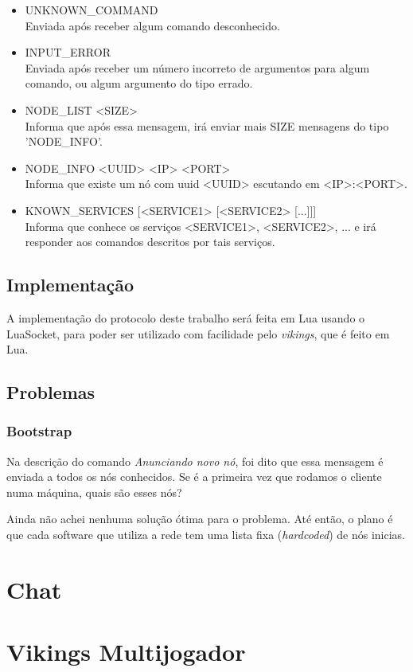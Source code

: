       \begin{itemize}
        \item UNKNOWN\_COMMAND \\
          Enviada após receber algum comando desconhecido.
          
        \item INPUT\_ERROR \\
          Enviada após receber um número incorreto de argumentos para algum comando, ou algum
          argumento do tipo errado.
      
        \item NODE\_LIST <SIZE> \\
          Informa que após essa mensagem, irá enviar mais SIZE mensagens do tipo 'NODE\_INFO'.
          
        \item NODE\_INFO <UUID> <IP> <PORT> \\
          Informa que existe um nó com uuid <UUID> escutando em <IP>:<PORT>.
          
        \item KNOWN\_SERVICES [<SERVICE1> [<SERVICE2> [...]]] \\
          Informa que conhece os serviços <SERVICE1>, <SERVICE2>, ... e irá responder aos
          comandos descritos por tais serviços.
      
      \end{itemize}
      
  \subsection{Implementação}
    A implementação do protocolo deste trabalho será feita em Lua usando o LuaSocket, %
    para poder ser utilizado com facilidade pelo \textit{vikings}, que é feito em Lua.
  
  \subsection{Problemas}
    \subsubsection{Bootstrap}
      Na descrição do comando \textit{Anunciando novo nó}, foi dito que essa mensagem é enviada a
      todos os nós conhecidos. Se é a primeira vez que rodamos o cliente numa máquina, quais são
      esses nós?
      
      Ainda não achei nenhuma solução ótima para o problema. Até então, o plano é que cada software
      que utiliza a rede tem uma lista fixa (\textit{hardcoded}) de nós inicias.

\section{Chat}
\label{sec:rede:chat}

\section{Vikings Multijogador}
\label{sec:rede:vikings}
